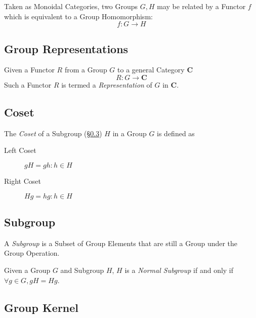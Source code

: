 Taken as Monoidal Categories, two Groups $G, H$ may be related by a
Functor $f$ which is equivalent to a Group Homomorphism:
\[
    f : G \rightarrow H
\]

\subsection{Group Representations}\label{subsec:group_representation}

Given a Functor $R$ from a Group $G$ to a general Category
$\mathbf{C}$
\[
    R : G \rightarrow \mathbf{C}
\]
Such a Functor $R$ is termed a \emph{Representation} of $G$ in
$\mathbf{C}$.

\subsection{Coset}\label{subsec:group_coset}

The \emph{Coset} of a Subgroup (\S\ref{subsec:subgroup}) $H$ in a Group $G$
is defined as
\begin{description}
\item[Left Coset] $gH = {gh : h \in H}$
\item[Right Coset] $Hg = {hg : h \in H}$
\end{description}

\subsection{Subgroup}\label{subsec:subgroup}

A \emph{Subgroup} is a Subset of Group Elements that are still a Group
under the Group Operation.

Given a Group $G$ and Subgroup $H$, $H$ is a \emph{Normal Subgroup} if
and only if $\forall g \in G, gH = Hg$.

\subsection{Group Kernel}\label{subsec:group_kernel}

